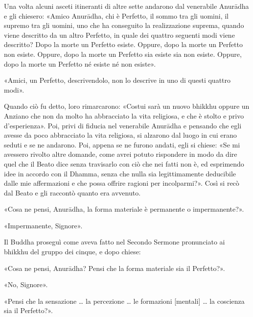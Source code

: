 Una volta alcuni asceti itineranti di altre sette andarono dal venerabile
Anurādha e gli chiesero: «Amico Anurādha, chi è Perfetto, il sommo tra gli
uomini, il supremo tra gli uomini, uno che ha conseguito la realizzazione
suprema, quando viene descritto da un altro Perfetto, in quale dei quattro
seguenti modi viene descritto? Dopo la morte un Perfetto esiste. Oppure, dopo la
morte un Perfetto non esiste. Oppure, dopo la morte un Perfetto sia esiste sia
non esiste. Oppure, dopo la morte un Perfetto né esiste né non
esiste».

«Amici, un Perfetto, descrivendolo, non lo descrive in uno di questi quattro
modi».

Quando ciò fu detto, loro rimarcarono: «Costui sarà un nuovo bhikkhu oppure un
Anziano che non da molto ha abbracciato la vita religiosa, e che è stolto e
privo d’esperienza». Poi, privi di fiducia nel venerabile Anurādha e pensando
che egli avesse da poco abbracciato la vita religiosa, si alzarono dal luogo in
cui erano seduti e se ne andarono. Poi, appena se ne furono andati, egli si
chiese: «Se mi avessero rivolto altre domande, come avrei potuto rispondere in
modo da dire quel che il Beato dice senza travisarlo con ciò che nei fatti non
è, ed esprimendo idee in accordo con il Dhamma, senza che nulla sia
legittimamente deducibile dalle mie affermazioni e che possa offrire ragioni per
incolparmi?». Così si recò dal Beato e gli raccontò quanto era avvenuto.

«Cosa ne pensi, Anurādha, la forma materiale è permanente o impermanente?».

«Impermanente, Signore».

 Il Buddha proseguì come aveva fatto nel Secondo
Sermone pronunciato ai bhikkhu del gruppo dei cinque, e dopo chiese:

«Cosa ne pensi, Anurādha? Pensi che la forma materiale sia il Perfetto?».

«No, Signore».

«Pensi che la sensazione … la percezione … le formazioni [mentali] … la
coscienza sia il Perfetto?».

